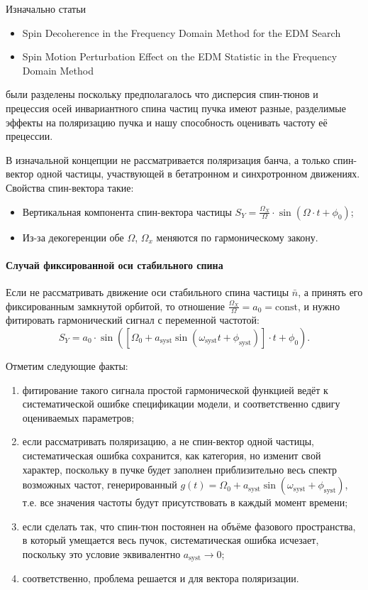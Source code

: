 \documentclass{article}
\newcommand{\W}{\Omega}
\newcommand{\w}{\omega}
\newcommand{\const}{\mathrm{const}}
\newcommand{\s}{{ \mathrm{syst} }}
\begin{document}
Изначально статьи
\begin{itemize}
\item Spin Decoherence in the Frequency Domain Method for the EDM Search
\item Spin Motion Perturbation Effect on the EDM Statistic in the Frequency Domain Method
\end{itemize}
были разделены поскольку предполагалось что дисперсия спин-тюнов и прецессия
осей инвариантного спина частиц пучка имеют разные, разделимые эффекты на
поляризацию пучка и нашу способность оценивать частоту её прецессии.

В изначальной концепции не рассматривается поляризация банча, а только спин-вектор одной частицы,
участвующей в бетатронном и синхротронном движениях. Свойства спин-вектора такие:
\begin{itemize}
\item Вертикальная компонента спин-вектора частицы $S_Y = \frac{\W_X}{\W}\cdot \sin(\W\cdot t + \phi_0)$;
\item Из-за декогеренции обе $\W$, $\W_x$ меняются по гармоническому закону.
\end{itemize}

\paragraph{Случай фиксированной оси стабильного спина}
Если не рассматривать движение оси стабильного спина частицы $\bar n$, а принять его фиксированным
замкнутой орбитой, то отношение $\frac{\W_X}{\W} = a_0 = \const$, и нужно фитировать гармонический сигнал
с переменной частотой:
\[
S_Y = a_0\cdot \sin\left(\left[\W_0 + a_\s\sin(\w_\s t + \phi_\s)\right]\cdot t + \phi_0\right).
\]

Отметим следующие факты:
\begin{enumerate}
\item фитирование такого сигнала простой гармонической функцией ведёт к систематической ошибке
  спецификации модели, и соответственно сдвигу оцениваемых параметров;
\item если рассматривать поляризацию, а не спин-вектор одной частицы, систематическая ошибка
  сохранится, как категория, но изменит свой характер, поскольку в пучке будет заполнен приблизительно
  весь спектр возможных частот, генерированный $g(t) = \W_0 + a_\s\sin(\w_\s + \phi_\s)$, т.е. все
  значения частоты будут присутствовать в каждый момент времени;
\item если сделать так, что спин-тюн постоянен на объёме фазового пространства, в который умещается 
  весь пучок, систематическая ошибка исчезает, поскольку это условие эквивалентно $a_\s \rightarrow 0$;
  \item соответственно, проблема решается и для вектора поляризации.
\end{enumerate}
\end{document}
